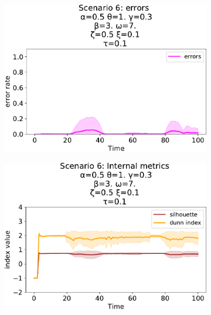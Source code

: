 \begin{figure}[!ht]
\begin{subfigure}[b]{0.32\textwidth}
    \includegraphics[width=\textwidth]{papers/swarm-intelligence2021/img/simulations/movement-errors_0_08_α-0.5_θ-1._γ-0.3_β-3._ω-7._ζ-0.5.pdf}
  \end{subfigure}
  \hfill
  \begin{subfigure}[b]{0.32\textwidth}
    \centering
    \includegraphics[width=\textwidth]{papers/swarm-intelligence2021/img/simulations/movement-metrics_0_0910_α-0.5_θ-1._γ-0.3_β-3._ω-7._ζ-0.5.pdf}
  \end{subfigure}
  \\
  \begin{subfigure}[b]{0.32\textwidth}
    \centering

\end{subfigure}
\end{figure}
